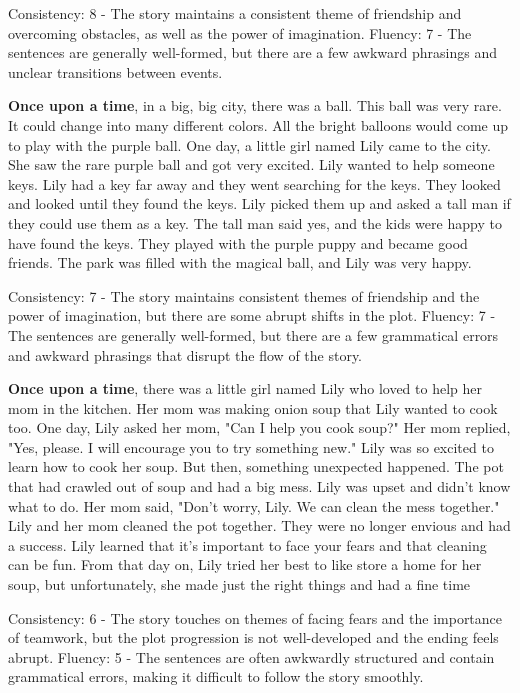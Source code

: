 \documentclass{article}
\begin{document}
Consistency: 8 - The story maintains a consistent theme of friendship and overcoming obstacles, as well as the power of imagination.
Fluency: 7 - The sentences are generally well-formed, but there are a few awkward phrasings and unclear transitions between events.

\textbf{Once upon a time}, in a big, big city, there was a ball. This ball was very rare. It could change into many different colors. All the bright balloons would come up to play with the purple ball. One day, a little girl named Lily came to the city. She saw the rare purple ball and got very excited. Lily wanted to help someone keys. Lily had a key far away and they went searching for the keys. They looked and looked until they found the keys. Lily picked them up and asked a tall man if they could use them as a key. The tall man said yes, and the kids were happy to have found the keys. They played with the purple puppy and became good friends. The park was filled with the magical ball, and Lily was very happy.

Consistency: 7 - The story maintains consistent themes of friendship and the power of imagination, but there are some abrupt shifts in the plot.
Fluency: 7 - The sentences are generally well-formed, but there are a few grammatical errors and awkward phrasings that disrupt the flow of the story.

\textbf{Once upon a time}, there was a little girl named Lily who loved to help her mom in the kitchen. Her mom was making onion soup that Lily wanted to cook too. One day, Lily asked her mom, "Can I help you cook soup?" Her mom replied, "Yes, please. I will encourage you to try something new." Lily was so excited to learn how to cook her soup. But then, something unexpected happened. The pot that had crawled out of soup and had a big mess. Lily was upset and didn't know what to do. Her mom said, "Don't worry, Lily. We can clean the mess together." Lily and her mom cleaned the pot together. They were no longer envious and had a success. Lily learned that it's important to face your fears and that cleaning can be fun. From that day on, Lily tried her best to like store a home for her soup, but unfortunately, she made just the right things and had a fine time

Consistency: 6 - The story touches on themes of facing fears and the importance of teamwork, but the plot progression is not well-developed and the ending feels abrupt.
Fluency: 5 - The sentences are often awkwardly structured and contain grammatical errors, making it difficult to follow the story smoothly.
\end{document}
